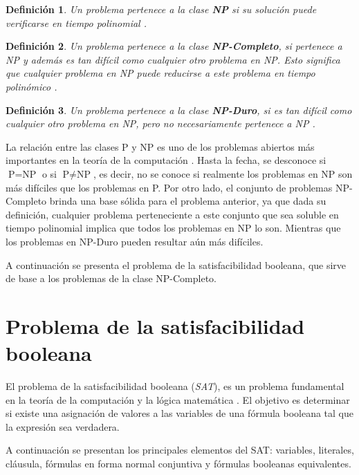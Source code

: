 \documentclass[12pt]{article}
\newtheorem{definition}{Definición}
\begin{document}
\begin{definition}
  Un problema pertenece a la clase \textbf{NP} si su solución puede verificarse en tiempo polinomial \cite{authomataTheory}.
\end{definition}

\begin{definition}
  Un problema pertenece a la clase \textbf{NP-Completo}, si pertenece a NP y además es tan difícil como cualquier otro problema en NP. Esto significa que cualquier problema en NP puede reducirse a este problema en tiempo polinómico \cite{authomataTheory}.
\end{definition}

\begin{definition}
  Un problema pertenece a la clase \textbf{NP-Duro}, si es tan difícil como cualquier otro problema en NP, pero no necesariamente pertenece a NP \cite{authomataTheory}. 
\end{definition}

La relación entre las clases P y NP es uno de los problemas abiertos más importantes en la teoría de la computación 
\cite{authomataTheory}. Hasta la fecha, se desconoce si $\text{P} = \text{NP}$ o si $\text{P} \neq \text{NP}$, es decir, 
no se conoce si realmente los problemas en NP son más difíciles que los problemas en P. Por otro lado, el conjunto de 
problemas NP-Completo brinda una base sólida para el problema anterior, ya que dada su definición, cualquier problema 
perteneciente a este conjunto que sea soluble en tiempo polinomial implica que todos los problemas en NP lo son. 
Mientras que los problemas en NP-Duro pueden resultar aún más difíciles. 

A continuación se presenta el problema de la satisfacibilidad booleana, que sirve de base a los problemas de la clase NP-Completo.

\section{Problema de la satisfacibilidad booleana}

El problema de la satisfacibilidad booleana (\textit{SAT}), es un problema fundamental en la teoría de la computación y la lógica matemática \cite{authomataTheory}. El objetivo es determinar si existe una asignación de valores a las variables de una fórmula booleana tal que la expresión sea verdadera.

A continuación se presentan los principales elementos del SAT: variables, literales, cláusula, fórmulas en forma normal conjuntiva y fórmulas booleanas equivalentes.
\end{document}
